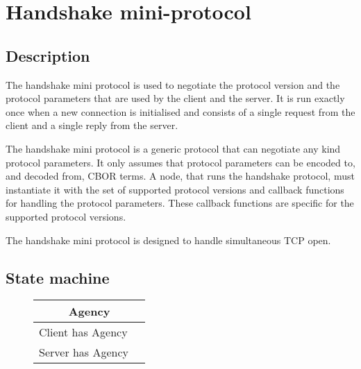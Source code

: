 \section{Handshake mini-protocol}
\label{handshake-protocol}
\newcommand{\StPropose}{\state{StPropose}}
\newcommand{\StConfirm}{\state{StConfirm}}
\newcommand{\MsgProposeVersions}{\msg{MsgProposeVersions}}
\newcommand{\MsgReplyVersions}{\msg{MsgReplyVersion}}
\newcommand{\MsgAcceptVersion}{\msg{MsgAcceptVersion}}
\newcommand{\MsgRefuse}{\msg{MsgRefuse}}

\newcommand{\VersionMismatch}{\msg{VersionMismatch}}
\newcommand{\HandshakeDecodeError}{\msg{HandshakeDecodeError}}
\newcommand{\Refused}{\msg{Refused}}

\subsection{Description}
The handshake mini protocol is used to negotiate the protocol version
and the protocol parameters that are used by the client and the server.
It is run exactly once when a new connection is initialised
and consists of a single request from the client and a single reply from the server.

The handshake mini protocol is a generic protocol that can negotiate any kind protocol parameters.
It only assumes that protocol parameters can be encoded to, and decoded from, CBOR terms.
A node, that runs the handshake protocol, must instantiate it with the set of
supported protocol versions and callback functions for handling the protocol parameters.
These callback functions are specific for the supported protocol versions.

The handshake mini protocol is designed to handle simultaneous TCP open.

\subsection{State machine}

\begin{figure}[h]
  \begin{tabular}{|l|l|}
    \hline
    \multicolumn{2}{|c|}{Agency} \\ \hline
    Client has Agency & \StPropose \\ \hline
    Server has Agency & \StConfirm \\  \hline
  \end{tabular}
\end{figure}

